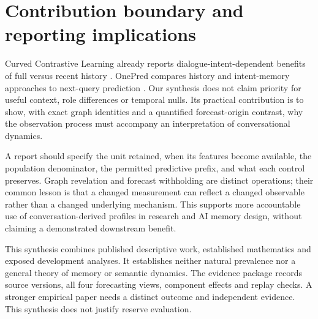 \documentclass{iscs}
\begin{document}
\section{Contribution boundary and reporting implications}
Curved Contrastive Learning already reports dialogue-intent-dependent benefits
of full versus recent history \cite{erker2023}. OnePred compares history and
intent-memory approaches to next-query prediction \cite{chen2026onepred}.
Our synthesis does not claim priority for useful context, role differences or
temporal nulls. Its practical contribution is to show, with exact graph
identities and a quantified forecast-origin contrast, why the observation
process must accompany an interpretation of conversational dynamics.

A report should specify the unit retained, when its features become available,
the population denominator, the permitted predictive prefix, and what each
control preserves. Graph revelation and forecast withholding are distinct
operations; their common lesson is that a changed measurement can reflect a
changed observable rather than a changed underlying mechanism. This supports
more accountable use of conversation-derived profiles in research and AI memory
design, without claiming a demonstrated downstream benefit.

This synthesis combines published descriptive work, established mathematics
and exposed development analyses. It establishes neither natural prevalence
nor a general theory of memory or semantic dynamics. The evidence package
records source versions, all four forecasting views, component effects and
replay checks. A stronger empirical paper needs a distinct outcome and
independent evidence. This synthesis does not justify reserve evaluation.


\end{document}
